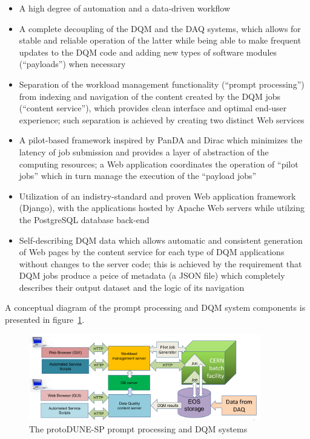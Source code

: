 \documentclass{webofc}
\begin{document}
\begin{itemize}

\item A high degree of automation and a data-driven workflow

\item A complete decoupling of the DQM and the DAQ systems, which allows
for stable and reliable operation of the latter while being able to make frequent updates to the
DQM code and adding new types of software modules (``payloads'') when necessary

\item Separation of the workload management functionality (``prompt processing'') from
indexing and navigation of the content created by the DQM  jobs (``content service''), which provides clean
interface and optimal end-user experience; such separation is achieved by creating two
distinct Web services

\item A pilot-based framework inspired by PanDA and Dirac \cite{panda,dirac}
which minimizes the latency of job submission and provides a layer of abstraction
of the computing resources; a Web application coordinates the operation of ``pilot jobs''
which in turn manage the execution of the ``payload jobs''


\item Utilization of an indistry-standard and proven Web application framework (Django)\cite{django},
with the applications hosted by Apache Web servers while utilzing the PostgreSQL database
back-end

\item Self-describing DQM data which allows automatic and consistent generation of Web pages
by the content service
for each type of DQM applications without changes to the server code; this is achieved by the
requirement that DQM jobs produce a peice of metadata (a JSON file) which completely
describes their output dataset and the logic of its navigation

\end{itemize}
\noindent
A conceptual diagram of the prompt processing and DQM system components
is presented in figure~\ref{dqm-diagram}.

\begin{figure}[h]
\centering
\includegraphics[width=0.9\textwidth,clip]{figures/dqm-p3s-diagram.png}
\caption{The protoDUNE-SP prompt processing and DQM systems}
\label{dqm-diagram}
\end{figure}
\end{document}

